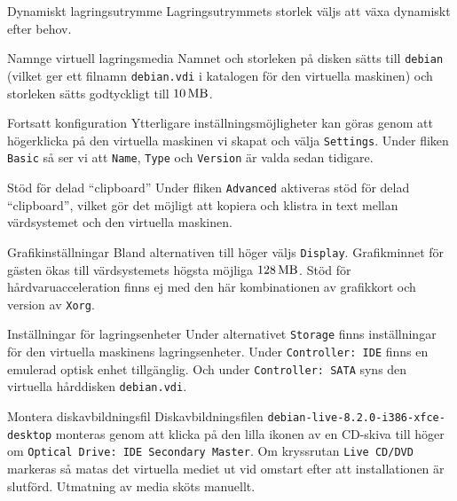            {Dynamiskt lagringsutrymme}
           {Lagringsutrymmets storlek väljs att växa dynamiskt efter behov.}
           {}

           {Namnge virtuell lagringsmedia}
           {Namnet och storleken på disken sätts till \texttt{debian} (vilket
            ger ett filnamn \texttt{debian.vdi} i katalogen för den virtuella
            maskinen) och storleken sätts godtyckligt till $\SI{10}{\mega\byte}$.}
           {}

           {Fortsatt konfiguration}
           {Ytterligare inställningsmöjligheter kan göras genom att högerklicka
            på den virtuella maskinen vi skapat och välja \texttt{Settings}.
            Under fliken \texttt{Basic} så ser vi att \texttt{Name}, \texttt{Type}
            och \texttt{Version} är valda sedan tidigare.}
           {}

           {Stöd för delad ``clipboard''}
           {Under fliken \texttt{Advanced} aktiveras stöd för delad ``clipboard'',
            vilket gör det möjligt att kopiera och klistra in text mellan
            värdsystemet och den virtuella maskinen.}
           {}

           {Grafikinställningar}
           {Bland alternativen till höger väljs \texttt{Display}.
            Grafikminnet för gästen ökas till värdsystemets högsta möjliga
            $\SI{128}{\mega\byte}$. Stöd för hårdvaruacceleration finns ej med
            den här kombinationen av grafikkort och version av \texttt{Xorg}.}
           {}

           {Inställningar för lagringsenheter}
           {Under alternativet \texttt{Storage} finns inställningar för den
            virtuella maskinens lagringsenheter. Under \texttt{Controller: IDE}
            finns en emulerad optisk enhet tillgänglig.
            Och under \texttt{Controller: SATA} syns den virtuella hårddisken
            \texttt{debian.vdi}.}
           {}

           {Montera diskavbildningsfil}
           {Diskavbildningsfilen \texttt{debian-live-8.2.0-i386-xfce-desktop} monteras
            genom att klicka på den lilla ikonen av en CD-skiva till höger om
            \texttt{Optical Drive: IDE Secondary Master}. Om kryssrutan
            \texttt{Live CD/DVD} markeras så matas det virtuella mediet ut vid omstart
            efter att installationen är slutförd. Utmatning av media sköts manuellt.}
           {}


